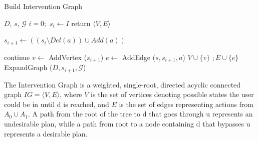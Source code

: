 \documentclass[letterpaper]{article}
\theoremstyle{plain}
\begin{document}
\begin{algorithm}[tb]
        \caption{Build Intervention Graph}
        \label{bsg}
        \begin{algorithmic}[1]
                \Require $D$, $s$, $\mathcal{G}$
                \State $i=0;$ $ s_{i} \gets I $
                 return $\langle V,E\rangle$
                \Else
                                \State \parbox[t]{0.95\linewidth} 
                                {$s_{i+1} \gets ((s_{i} \setminus Del(a))\cup Add(a))$}
                                 continue \EndIf
                                \State $v \gets$ AddVertex ($s_{i+1}$)
                                \State $e \gets$ AddEdge ($s, s_{i+1}, a$)
                                \State $V \cup \{v\}$ $; E \cup \{e\}$
                                \State ExpandGraph ($D, s_{i+1}, \mathcal{G}$)
                        \EndFor
                \EndIf  
                \EndProcedure
        \end{algorithmic}
\end{algorithm}

The Intervention Graph is a weighted, single-root, directed acyclic connected graph $IG= \langle V,E \rangle$, where $V$ is the set of vertices denoting possible states the user could be in until $\mathrm{d}$ is reached, and $E$ is the set of edges representing actions from $A_0 \cup A_{1}$. A path from the root of the tree to $\mathrm{d}$ that goes through $\mathrm{u}$ represents an undesirable plan, while a path from root to a node containing $\mathrm{d}$ that bypasses $\mathrm{u}$ represents a desirable plan.
 

\end{document}
